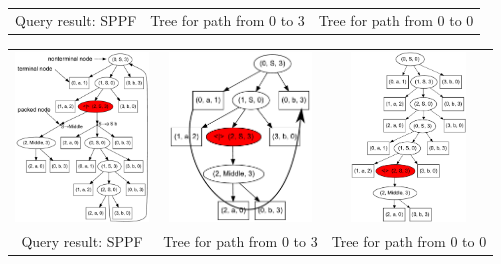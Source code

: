 \documentclass{beamer}
\begin{document}
\begin{frame}
\begin{overprint}
\begin{tabular}{  c  c  c  }
\\
\small{Query result: SPPF}
& \small{Tree for path from 0 to 3}
& \small{Tree for path from 0 to 0}
\end{tabular}
\begin{tabular}{  c  c  c  }
    \includegraphics[height=4.5cm]{pictures/AnBn.pdf}
    &
    \includegraphics[height=4.5cm]{pictures/AnBn_2_m.pdf}

    &
    \includegraphics[height=4.5cm]{pictures/AnBn_1.pdf}

\\
\small{Query result: SPPF}
& \small{Tree for path from 0 to 3}
& \small{Tree for path from 0 to 0}

\end{tabular}
\end{overprint}

\end{frame}
\end{document}
